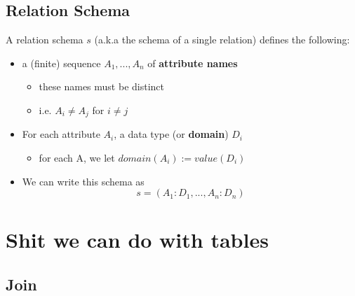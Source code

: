 \documentclass{article}
\begin{document}
\subsection*{Relation Schema}
A relation schema $s$ (a.k.a the schema of a single relation) defines the following:
\begin{itemize}
    \item a (finite) sequence $A_1,...,A_n$ of \textbf{attribute names}
    \begin{itemize}
        \item these names must be distinct
        \item i.e. $A_i \neq A_j$ for $i \neq j$
    \end{itemize}
    \item For each attribute $A_i$, a data type (or \textbf{domain}) $D_i$
    \begin{itemize}
        \item for each A, we let $domain(A_i):= value(D_i)$
    \end{itemize}
    \item We can write this schema as $$s = (A_1 : D_1,...,A_n : D_n)$$
\end{itemize}

\section*{Shit we can do with tables}
\subsection*{Join}
\end{document}
